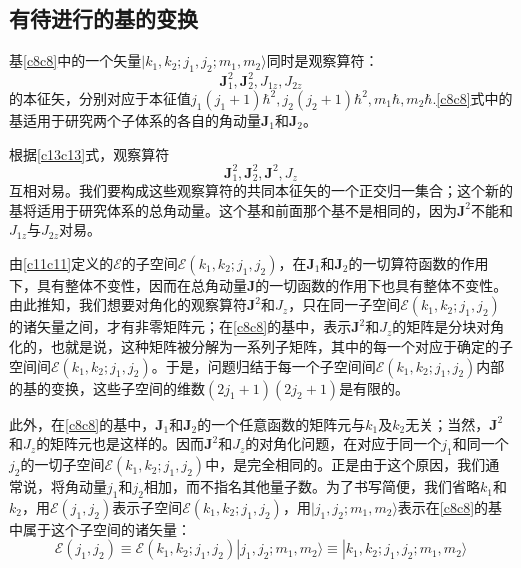 \documentclass[]{article}
\begin{document}
\subsection{有待进行的基的变换}
基\eqref{c8c8}中的一个矢量$|k_1,k_2;j_1,j_2;m_1,m_2\rangle$同时是观察算符：
\begin{equation}
	\boldsymbol{J}_1^2,\boldsymbol{J}_2^2,J_{1z},J_{2z}
\end{equation}
的本征矢，分别对应于本征值$j_1(j_1+1)\hbar^2,j_2(j_2+1)\hbar^2,m_1\hbar,m_2\hbar$.\eqref{c8c8}式中的基适用于研究两个子体系的各自的角动量$\boldsymbol{J}_1$和$\boldsymbol{J}_2$。\par 
根据\eqref{c13c13}式，观察算符
\begin{equation}
	\boldsymbol{J}_1^2,\boldsymbol{J}_2^2,\boldsymbol{J}^2,J_z
\end{equation}
互相对易。我们要构成这些观察算符的共同本征矢的一个正交归一集合；这个新的基将适用于研究体系的总角动量。这个基和前面那个基不是相同的，因为$\boldsymbol{J}^2$不能和$J_{1z}$与$J_{2z}$对易。\par 
由\eqref{c11c11}定义的$\mathscr{E}$的子空间$\mathscr{E}(k_1,k_2;j_1,j_2)$，在$\boldsymbol{J}_1$和$\boldsymbol{J}_2$的一切算符函数的作用下，具有整体不变性，因而在总角动量$\boldsymbol{J}$的一切函数的作用下也具有整体不变性。由此推知，我们想要对角化的观察算符$\boldsymbol{J}^2$和$J_z$，只在同一子空间$\mathscr{E}(k_1,k_2;j_1,j_2)$的诸矢量之间，才有非零矩阵元；在\eqref{c8c8}的基中，表示$\boldsymbol{J}^2$和$J_z$的矩阵是分块对角化的，也就是说，这种矩阵被分解为一系列子矩阵，其中的每一个对应于确定的子空间间$\mathscr{E}(k_1,k_2;j_1,j_2)$。于是，问题归结于每一个子空间间$\mathscr{E}(k_1,k_2;j_1,j_2)$内部的基的变换，这些子空间的维数$(2j_1+1)(2j_2+1)$是有限的。\par 
此外，在\eqref{c8c8}的基中，$\boldsymbol{J}_1$和$\boldsymbol{J}_2$的一个任意函数的矩阵元与$k_1$及$k_2$无关；当然，$\boldsymbol{J}^2$和$J_z$的矩阵元也是这样的。因而$\boldsymbol{J}^2$和$J_z$的对角化问题，在对应于同一个$j_1$和同一个$j_2$的一切子空间$\mathscr{E}(k_1,k_2;j_1,j_2)$中，是完全相同的。正是由于这个原因，我们通常说，将角动量$j_1$和$j_2$相加，而不指名其他量子数。为了书写简便，我们省略$k_1$和$k_2$，用$\mathscr{E}(j_1,j_2)$表示子空间$\mathscr{E}(k_1,k_2;j_1,j_2)$，用$|j_1,j_2;m_1,m_2\rangle$表示在\eqref{c8c8}的基中属于这个子空间的诸矢量：
\begin{subequations}
	\begin{equation}
		\mathscr{E}(j_1,j_2)\equiv\mathscr{E}(k_1,k_2;j_1,j_2)
	\end{equation}
	\begin{equation}
		|j_1,j_2;m_1,m_2\rangle\equiv|k_1,k_2;j_1,j_2;m_1,m_2\rangle
		\label{c21bc21b}
	\end{equation}
\end{subequations}
\end{document}

